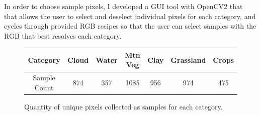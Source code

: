 \documentclass[12pt]{article}
\begin{document}
In order to choose sample pixels, I developed a GUI tool with OpenCV2 that that allows the user to select and deselect individual pixels for each category, and cycles through provided RGB recipes so that the user can select samples with the RGB that best resolves each category.

\begin{figure}
    \centering
    \begin{tabular}{C | C C C C C C}
        \textnormal{Category} & \textnormal{Cloud} & \textnormal{Water} & \textnormal{Mtn Veg} & \textnormal{Clay} & \textnormal{Grassland} & \textnormal{Crops} \\
        \hline
        \textnormal{Sample Count} & 874 & 357 & 1085 & 956 & 974 & 475 \\
    \end{tabular}
    \caption{Quantity of unique pixels collected as samples for each category.}
    \label{p3_samples}
\end{figure}
\end{document}
